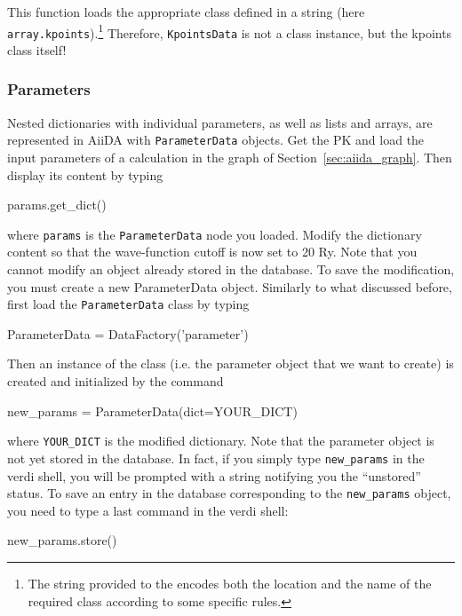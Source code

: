 This function loads the appropriate class defined in a string (here \texttt{array.kpoints}).\footnote{The string provided to the  encodes both the location and the name of the required class according to some specific rules.}
Therefore, \texttt{KpointsData} is not a class instance, but the kpoints class itself!


\subsubsection{Parameters}

Nested dictionaries with individual parameters, as well as lists and arrays, are
represented in AiiDA with \texttt{Parameter\-Data} objects. Get the PK and load
the input parameters of a calculation in the graph of Section~\ref{sec:aiida_graph}.
Then display its content by typing
\begin{pythoncommand}
 params.get_dict()
\end{pythoncommand}
where \texttt{params} is the \texttt{ParameterData} node you loaded. %
Modify the dictionary content so that the wave-function cutoff is now set to 20 Ry. 
Note that you cannot modify an object already stored in the database.
To save the modification, you must create a new ParameterData object. Similarly to what discussed before, first load the \texttt{ParameterData} class by typing
\begin{pythoncommand}
 ParameterData = DataFactory('parameter')
\end{pythoncommand}
Then an instance of the class (i.e. the parameter object
that we want to create) is created and initialized by the command
\begin{pythoncommand}
 new_params = ParameterData(dict=YOUR_DICT)
\end{pythoncommand}
where \texttt{YOUR\_DICT} is the modified dictionary.
Note that the parameter object is not yet stored in the database.
In fact, if you simply type \texttt{new\_params} in the verdi shell, you will be prompted with a string notifying you the ``unstored'' status.
To save an entry in the database corresponding to the \texttt{new\_params} object, you need to type a last command in the verdi shell:
\begin{pythoncommand}
 new_params.store()
\end{pythoncommand}

